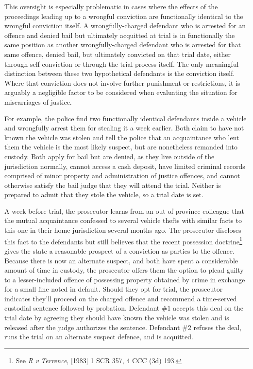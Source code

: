 This oversight is especially problematic in cases where the effects of the proceedings leading up to a wrongful conviction are functionally identical to the wrongful conviction itself. A wrongfully-charged defendant who is arrested for an offence and denied bail but ultimately acquitted at trial is in functionally the same position as another wrongfully-charged defendant who is arrested for that same offence, denied bail, but ultimately convicted on that trial date, either through self-conviction or through the trial process itself. The only meaningful distinction between these two hypothetical defendants is the conviction itself. Where that conviction does not involve further punishment or restrictions, it is arguably a negligible factor to be considered when evaluating the situation for miscarriages of justice.

For example, the police find two functionally identical defendants inside a vehicle and wrongfully arrest them for stealing it a week earlier. Both claim to have not known the vehicle was stolen and tell the police that an acquaintance who lent them the vehicle is the most likely suspect, but are nonetheless remanded into custody. Both apply for bail but are denied, as they live outside of the jurisdiction normally, cannot access a cash deposit, have limited criminal records comprised of minor property and administration of justice offences, and cannot otherwise satisfy the bail judge that they will attend the trial. Neither is prepared to admit that they stole the vehicle, so a trial date is set.

A week before trial, the prosecutor learns from an out-of-province colleague that the mutual acquaintance confessed to several vehicle thefts with similar facts to this one in their home jurisdiction several months ago. The prosecutor discloses this fact to the defendants but still believes that the recent possession doctrine\footnote{See \textit{R v Terrence}, [1983] 1 SCR 357, 4 CCC (3d) 193.} gives the state a reasonable prospect of a conviction as parties to the offence. Because there is now an alternate suspect, and both have spent a considerable amount of time in custody, the prosecutor offers them the option to plead guilty to a lesser-included offence of possessing property obtained by crime in exchange for a small fine noted in default. Should they opt for trial, the prosecutor indicates they'll proceed on the charged offence and recommend a time-served custodial sentence followed by probation. Defendant \#1 accepts this deal on the trial date by agreeing they should have known the vehicle was stolen and is released after the judge authorizes the sentence. Defendant \#2 refuses the deal, runs the trial on an alternate suspect defence, and is acquitted.

